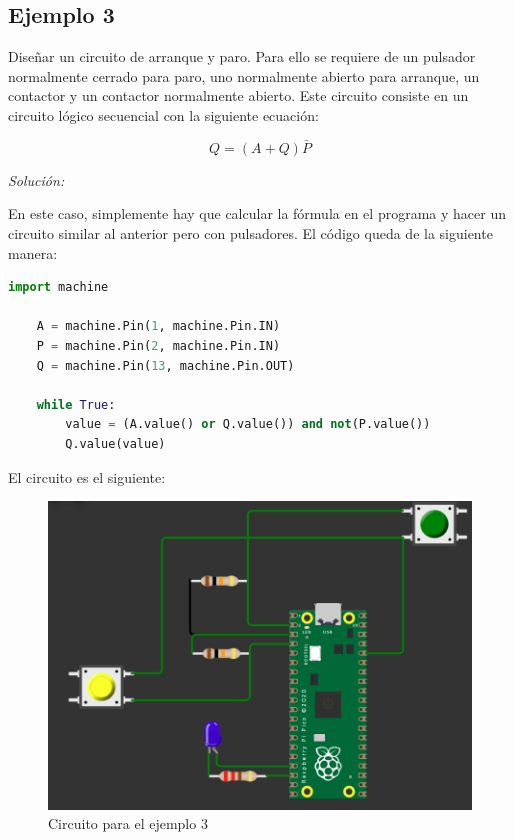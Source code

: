 \documentclass{article}
\begin{document}
    \subsection{Ejemplo 3}

    Diseñar un circuito de arranque y paro. Para ello se requiere de un
    pulsador normalmente cerrado para paro, uno normalmente abierto para
    arranque, un contactor y un contactor normalmente abierto. Este circuito
    consiste en un circuito lógico secuencial con la siguiente ecuación:

    $$
    Q = (A + Q)\bar{P}
    $$

    \bigbreak

    \textit{Solución:}

    \bigbreak

    En este caso, simplemente hay que calcular la fórmula en el programa y
    hacer un circuito similar al anterior pero con pulsadores. El código
    queda de la siguiente manera:

    \bigbreak

    \begin{lstlisting}[language=Python, caption={Programa para el ejemplo 3}]
    import machine

    A = machine.Pin(1, machine.Pin.IN)
    P = machine.Pin(2, machine.Pin.IN)
    Q = machine.Pin(13, machine.Pin.OUT)

    while True:
        value = (A.value() or Q.value()) and not(P.value())
        Q.value(value)
    \end{lstlisting}

    El circuito es el siguiente:

    \begin{figure}[H]
        \centering
        \includegraphics[width=0.5\paperwidth]{images/wokwi-example-3-circuit}
        \caption{Circuito para el ejemplo 3}
    \end{figure}
\end{document}
